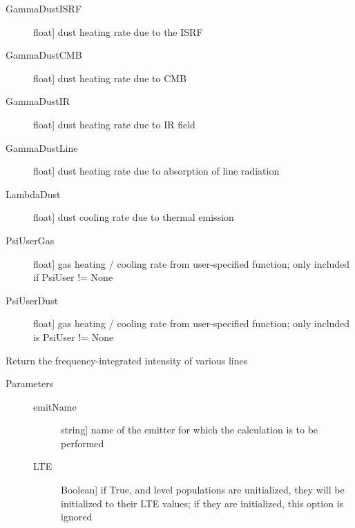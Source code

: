 \documentclass[letterpaper,10pt,english]{sphinxmanual}
\begin{document}
\begin{fulllineitems}
\begin{fulllineitems}
\begin{description}
\begin{description}
\item[{GammaDustISRF}] \leavevmode{[}float{]}
dust heating rate due to the ISRF

\item[{GammaDustCMB}] \leavevmode{[}float{]}
dust heating rate due to CMB

\item[{GammaDustIR}] \leavevmode{[}float{]}
dust heating rate due to IR field

\item[{GammaDustLine}] \leavevmode{[}float{]}
dust heating rate due to absorption of line radiation

\item[{LambdaDust}] \leavevmode{[}float{]}
dust cooling rate due to thermal emission

\item[{PsiUserGas}] \leavevmode{[}float{]}
gas heating / cooling rate from user-specified
function; only included if PsiUser != None

\item[{PsiUserDust}] \leavevmode{[}float{]}
gas heating / cooling rate from user-specified
function; only included is PsiUser != None

\end{description}

\end{description}

\end{fulllineitems}


\begin{fulllineitems}
\label{fulldoc:despotic.cloud.lineLum}
Return the frequency-integrated intensity of various lines
\begin{description}
\item[{Parameters}] \leavevmode\begin{description}
\item[{emitName}] \leavevmode{[}string{]}
name of the emitter for which the calculation is to be
performed

\item[{LTE}] \leavevmode{[}Boolean{]}
if True, and level populations are unitialized, they will
be initialized to their LTE values; if they are
initialized, this option is ignored


\end{description}
\end{description}
\end{fulllineitems}
\end{fulllineitems}
\end{document}
